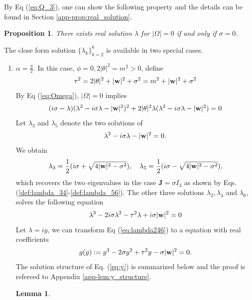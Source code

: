 \documentclass[10pt,reqno]{amsart}
\renewcommand{\(}{\left(}
\renewcommand{\)}{\right)}
\newcommand{\bw}{{\bf w}}
\newcommand{\bJ}{\mathbf{J}}
\newtheorem{lem}[theo]{Lemma}
\newtheorem{prop}[theo]{Proposition}
\numberwithin{equation}{section}
\begin{document}
By Eq (\ref{eq:Q_3}),  one can show the following property and the details can be found in Section \ref{app-prop:real_solution}.
\begin{prop}\label{prop:real_solution} There exists real solution $\lambda$ for $|\Omega|=0$ if and only if $\sigma=0$. 
\end{prop}
The close form solution $\{\lambda_k\}_{k=2}^6$ is available in two special cases.
\begin{enumerate}
	\item $\alpha=\frac{\pi}2$. In this case, $\phi=0, 2|\theta|^2 = m^2>0$,  define
	\[
	\tau^2 = 2|\theta|^2 + |\bw|^2 + \sigma^2 = m^2 + |\bw|^2 + \sigma^2 
	\]
By Eq (\ref{eq:Omega}), $|\Omega|=0$ implies 
	\begin{eqnarray*}
		(i\sigma -\lambda )(\lambda^2 -i\sigma\lambda -|\bw|^2 )^2 + 2|\theta|^2 \lambda(\lambda^2 - i\sigma\lambda -|\bw|^2) =0
	\end{eqnarray*}
Let $\lambda_3$ and $\lambda_5$ denote the two solutions of  
	\[
		\lambda^2 -i\sigma\lambda -|\bw|^2 =0.
		\]
We obtain
		\begin{eqnarray*}
		\lambda_3 = \frac 1{2} (i\sigma + \sqrt{4|\bw|^2 -\sigma^2}), \quad  \lambda_5 = \frac 12 (i\sigma - \sqrt{4|\bw|^2 -\sigma^2}),
	\end{eqnarray*}
which recovers the two eigenvalues in the case $\bJ = \sigma I_3$ as shown by Eqs. (\ref{def:lambda_34}-\ref{def:lambda_56}).
The other three solutions $\lambda_2, \lambda_4$ and $\lambda_6$,  solves the following equation
\begin{equation}\label{eq:lambda246}
	\lambda^3 -2 i\sigma\lambda^2  - \tau^2\lambda + i\sigma |\bw|^2  =0
\end{equation}
Let $\lambda=i y$, we can transform Eq (\ref{eq:lambda246}) to a equation with real coefficients
\begin{equation}\label{eq:y}
	g(y):=y^3 -2 \sigma y^2  + \tau^2 y  - \sigma |\bw|^2  =0.
	\end{equation}
The solution structure of Eq. (\ref{eq:y}) is summarized below and the proof is refereed to Appendix \ref{app-lem:y_structure}.
\begin{lem}\label{lem:y_structure} 
\begin{enumerate}

\end{enumerate}
\end{lem}
\end{enumerate}
\end{document}
